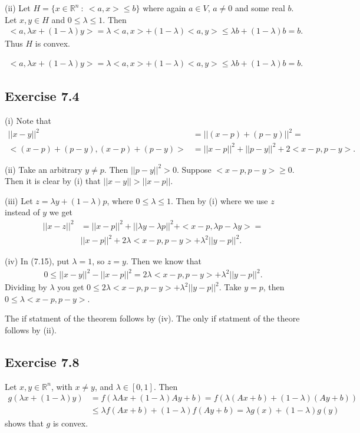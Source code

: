 \documentclass[11.5pt, letterpaper, bibtotoc,
    tablecaptionabove, figurecaptionabove]{article}
\begin{document}
(ii)
Let $H=\{x\in\mathbb R^n\ :\ <a,x>\leq b\}$ where again $a\in V$, $a\neq 0$ and some real $b$.
Let $x,y\in H$ and $0\leq\lambda\leq 1$.
Then 
\begin{align*}
    <a,\lambda x+(1-\lambda)y>=\lambda<a,x>+(1-\lambda)<a,y>\leq\lambda b + (1-\lambda)b=b.
\end{align*}
Thus $H$ is convex.

\begin{align*}
       <a,\lambda x+(1-\lambda)y>=\lambda<a,x>+(1-\lambda)<a,y>\leq\lambda b + (1-\lambda)b=b.
\end{align*}

\subsection*{Exercise 7.4}
(i)
Note that
\begin{align*}
    ||x-y||^2&=||(x-p)+(p-y)||^2=\\
    <(x-p)+(p-y),(x-p)+(p-y)>&=
    ||x-p||^2+||p-y||^2+2<x-p,p-y>.
\end{align*}

(ii)
Take an arbitrary $y\neq p$. Then $||p-y||^2> 0$.
Suppose $<x-p,p-y>\geq0$. Then it is clear by (i)
that $||x-y||>||x-p||$.

(iii)
Let $z=\lambda y+(1-\lambda)p$, where $0\leq\lambda\leq1$.
Then by (i) where we use $z$ instead of $y$ we get
\begin{align*}
    ||x-z||^2&=
    ||x-p||^2+||\lambda y-\lambda p||^2+
    <x-p,\lambda p-\lambda y>=\\
    &||x-p||^2+2\lambda<x-p,p-y>+\lambda^2||y-p||^2.
\end{align*}

(iv)
In (7.15), put $\lambda=1$, so $z=y$.
Then we know that
\begin{align*}
    0\leq||x-y||^2-||x-p||^2=2\lambda<x-p,p-y>+\lambda^2||y-p||^2.
\end{align*}
Dividing by $\lambda$ you get $0\leq2\lambda<x-p,p-y>+\lambda^2||y-p||^2$.
Take $y=p$, then $0\leq\lambda<x-p,p-y>$.

The if statment of the theorem follows by (iv).
The only if statment of the theore follows by (ii).

\subsection*{Exercise 7.8}
Let $x, y\in\mathbb R^n$, with $x\neq y$, and $\lambda\in[0,1]$.
Then
\begin{align*}
    g(\lambda x+(1-\lambda)y)&=
    f(\lambda Ax + (1-\lambda)Ay + b)=
    f(\lambda(Ax+b) + (1-\lambda)(Ay+b))\\
    &\leq\lambda f(Ax+b) + (1-\lambda)f(Ay+b)=
    \lambda g(x) + (1-\lambda)g(y)
\end{align*}
shows that $g$ is convex.
\end{document}
